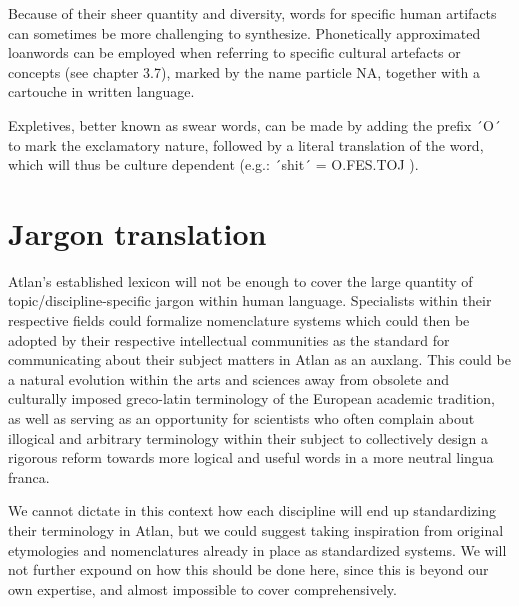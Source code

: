 \noindent Because of their sheer quantity and diversity, words for specific human artifacts can sometimes be more challenging to synthesize. Phonetically approximated loanwords can be employed when referring to specific cultural artefacts or concepts (see chapter 3.7), marked by the name particle NA, together with a cartouche in written language. 

Expletives, better known as swear words, can be made by adding the prefix ´O´ \Atlano to mark the exclamatory nature, followed by a literal translation of the word, which will thus be culture dependent (e.g.: ´shit´ = O.FES.TOJ \Atlano \fes \toj). 

\section{Jargon translation}


Atlan’s established lexicon will not be enough to cover the large quantity of topic/discipline-specific jargon within human language. Specialists within their respective fields could formalize nomenclature systems which could then be adopted by their respective intellectual communities as the standard for communicating about their subject matters in Atlan as an auxlang. This could be a natural evolution within the arts and sciences away from obsolete and culturally imposed greco-latin terminology of the European academic tradition, as well as serving as an opportunity for scientists who often complain about illogical and arbitrary terminology within their subject to collectively design a rigorous reform towards more logical and useful words in a more neutral lingua franca.  

We cannot dictate in this context how each discipline will end up standardizing their terminology in Atlan, but we could suggest taking inspiration from original etymologies and nomenclatures already in place as standardized systems. We will not further expound on how this should be done here, since this is beyond our own expertise, and almost impossible to cover comprehensively.







